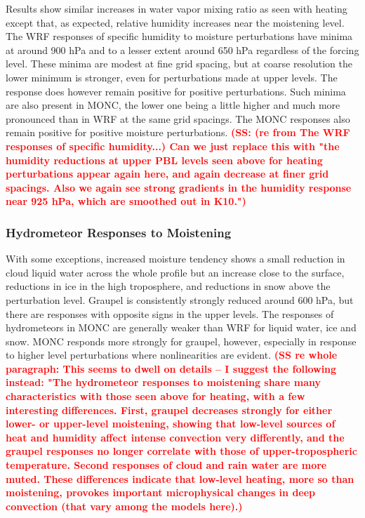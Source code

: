 \documentclass[draft]{agujournal2019}
\newcommand{\todo}[1]{\textcolor{red}{\textbf{(#1)}}}
\begin{document}
Results show similar increases in water vapor mixing ratio as seen with heating except that, as expected, relative humidity increases near the moistening level. The WRF responses of specific humidity to moisture perturbations have minima at
around 900 hPa and to a lesser extent around 650 hPa regardless of the forcing
level. These minima are modest at fine grid spacing, but at coarse resolution
the lower minimum is stronger, even for perturbations made at upper levels.
The response does however remain positive for positive perturbations. Such minima are also
present in MONC, the lower one being a little higher and much more
pronounced than in WRF at the same grid spacings. The MONC responses also
remain positive for positive moisture perturbations. \todo{SS: (re from The WRF responses of specific humidity...) Can we just replace this with "the humidity reductions at upper PBL levels seen above for heating perturbations appear again here, and again decrease at finer grid spacings.  Also we again see strong gradients in the humidity response near 925 hPa, which are smoothed out in K10."}

\subsubsection{Hydrometeor Responses to Moistening}

With some exceptions, increased moisture
tendency shows a small reduction in cloud liquid water across the whole profile
but an increase close to the surface, reductions in ice in the high troposphere,
and reductions in snow above the perturbation level. Graupel is consistently
strongly reduced around 600 hPa, but there are responses with opposite signs in
the upper levels. The responses of hydrometeors in MONC are generally weaker
than WRF for liquid water, ice and snow. MONC responds more strongly for
graupel, however, especially in response to higher level perturbations where
nonlinearities are evident. \todo{SS re whole paragraph: This seems to dwell on details -- I suggest the following instead: "The hydrometeor responses to moistening share many characteristics with those seen above for heating, with a few interesting differences.  First, graupel decreases strongly for either lower- or upper-level moistening, showing that low-level sources of heat and humidity affect intense convection very differently, and the graupel responses no longer correlate with those of upper-tropospheric temperature.  Second responses of cloud and rain water are more muted. These differences indicate that low-level heating, more so than moistening, provokes important microphysical changes in deep convection (that vary among the models here).}
\end{document}
